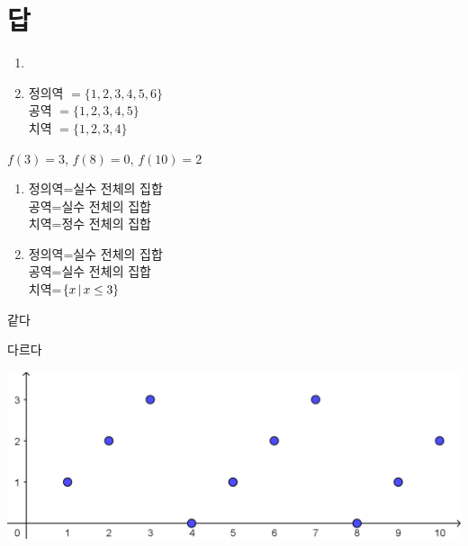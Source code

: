 \documentclass{oblivoir}
\begin{document}
\section*{답}
\begin{multicols*}{2}

%

%
\begin{enumerate}
\item
\mbox{}
\item
정의역	$=\{1,2,3,4,5,6\}$\\
공역		$=\{1,2,3,4,5\}$\\
치역		$=\{1,2,3,4\}$
\end{enumerate}

%
\(f(3)=3\), \(f(8)=0\), \(f(10)=2\)

%
\begin{enumerate}
\item
정의역=실수 전체의 집합\\
공역=실수 전체의 집합\\
치역=정수 전체의 집합
\item
정의역=실수 전체의 집합\\
공역=실수 전체의 집합\\
치역=\(\{x\,|\, x\le3\}\)
\end{enumerate}

%
\begin{enumerate*}[itemjoin=\qquad]
\item
같다
\item
다르다
\end{enumerate*}

%
\begin{center}
\includegraphics[width=\columnwidth]{graph_3a}
\end{center}


\end{multicols*}
\end{document}
